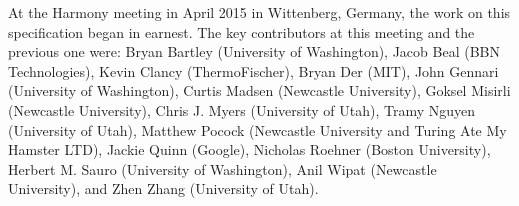 At the Harmony meeting in April 2015 in Wittenberg, Germany, the work on this specification began in earnest.  The key contributors at this meeting and the previous one were: Bryan Bartley (University of Washington), Jacob Beal (BBN Technologies), Kevin Clancy (ThermoFischer), Bryan Der (MIT), John Gennari (University of Washington), Curtis Madsen (Newcastle University), Goksel Misirli (Newcastle University), Chris J. Myers (University of Utah), Tramy Nguyen (University of Utah), Matthew Pocock (Newcastle University and Turing Ate My Hamster LTD), Jackie Quinn (Google), Nicholas Roehner (Boston University), Herbert M. Sauro (University of Washington), Anil Wipat (Newcastle University), and Zhen Zhang (University of Utah).
